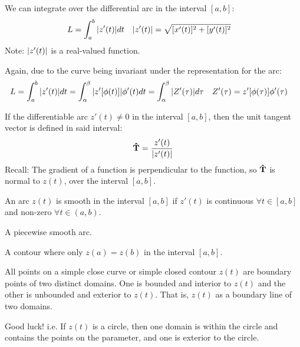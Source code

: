 \documentclass[12pt, english]{book}
\makeatletter
\renewenvironment{proof}[1][\proofname]{\par
	\pushQED{\qed}%
	\normalfont \topsep6\p@\@plus6\p@\relax
	\list{}{%
		\settowidth{\leftmargin}{\itshape\proofname:\hskip\labelsep}%
		\setlength{\labelwidth}{0pt}%
		\setlength{\itemindent}{-\leftmargin}%
	}%
	\item[\hskip\labelsep\itshape#1\@addpunct{:}]\ignorespaces
	}{ \popQED\endlist\@endpefalse}
\makeatother
\begin{document}
	We can integrate over the differential arc in the interval \([a,b]\):
	\begin{align*}
		L &= \int_{a}^{b} \abs{z'(t)} dt	&	\abs{z'(t)} &= \sqrt{[x'(t)]^2 + [y'(t)]^2}
	\end{align*}
	Note: \(\abs{z'(t)}\) is a real-valued function. 
	
	Again, due to the curve being invariant under the representation for the arc:
	\begin{align*}
		L &= \int_{a}^{b} \abs{z'(t)} dt = \int_{\alpha}^{\beta} \abs{z'[\phi(t)]} \phi'(t) dt = \int_{\alpha}^{\beta} \abs{Z'(\tau)} d\tau 
			& Z'(\tau) &= z'[\phi(\tau)] \phi'(\tau)
	\end{align*} 

	If the differentiable arc \(z'(t) \neq 0\) in the interval \([a,b]\), then the unit tangent vector is defined in said interval: 
	\begin{align*}
		\vu{T} = \frac{z'(t)}{\abs{z'(t)}}
	\end{align*}
	Recall: The gradient of a function is perpendicular to the function, so \(\vu{T}\) is  normal to \(z(t)\), over the interval \([a,b]\).
	
	\begin{definition}[Smooth]
		\label{Smooth Definition - Complex}
		An arc \(z(t)\) is smooth in the interval \([a,b]\) if \(z'(t)\) is continuous \(\forall t \in [a,b]\) and non-zero \(\forall t \in (a,b)\).
	\end{definition}
	
	\begin{definition}[Contour]
		\label{Contour Definition - Complex}
		A piecewise smooth arc.
	\end{definition}

	\begin{definition}
		\label{Simple Closed Contour Definition - Complex}
		A contour where only \(z(a) = z(b)\) in the interval \([a,b]\).
	\end{definition}
	
	\begin{theorem}
		\label{Jordan Curve Theorem - Complex}
		All points on a simple close curve or simple closed contour \(z(t)\) are boundary points of two distinct domains. One is bounded and interior to \(z(t)\) and the other is unbounded and exterior to \(z(t)\).  That is, \(z(t)\) as a boundary line of two domains. 
	\end{theorem}
	\begin{proof}
		Good luck!
	\end{proof}
	i.e. If \(z(t)\) is a circle, then one domain is within the circle and contains the points on the parameter, and one is exterior to the circle.
	
\end{document}
